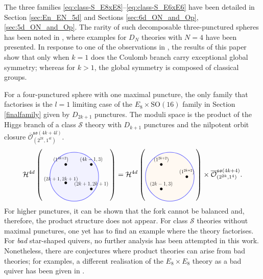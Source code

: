 \documentclass[a4paper,11pt]{article}
\begin{document}
 The three families \eqref{eq:class-S_E8xE8}--\eqref{eq:class-S_E6xE6} have been detailed in Section \ref{sec:En_EN_5d} and Sections  \ref{sec:6d_ON_and_Op}, \ref{sec:5d_ON_and_Op}. The rarity of such decomposable three-punctured spheres has been noted in \cite{Distler:2017xba}, where examples for $D_N$ theories with $N=4$ have been presented. In response to one of the observations in \cite{Distler:2017xba}, the results of this paper show that only when $k=1$ does the Coulomb branch carry exceptional global symmetry; whereas for $k>1$, the global symmetry is composed of classical groups.

For a four-punctured sphere with one maximal puncture, the only family that factorises is the $l=1$ limiting case of the $E_8 \times \mathrm{SO}(16)$ family in Section \ref{finalfamily} given by $D_{2k+1}$ punctures. The moduli space is the product of the Higgs branch of a class $\mathcal{S}$ theory with $D_{k+1}$ punctures and the nilpotent orbit closure $\overline{\mathcal{O}}^{\mathfrak{so}(4k+4l)}_{(2^{2k},1^{4l})}$. 
\begin{equation}
   \mathcal{H}^{4d} \left( \raisebox{-.5\height}{\scalebox{.6}{\begin{tikzpicture}
        \filldraw[color=blue!60, fill=blue!5, very thick](0,0) circle (2);
        \filldraw[fill=black!100] (1.4,-1) circle (.1);
        \filldraw[fill=black!100] (-.7,1) circle (.1);
        \filldraw[fill=black!100] (-.7,-0.5) circle (.1);
          \filldraw[fill=black!100] (1.4,1) circle (.1);
        \node at (1.4,-.6) {\large$(2k+1,2k+1)$};
        \node at (-1.1,1.4) {\large $(1^{4k+2})$};
        \node at (-1.1,-.2) {\large$(2k+1,2k+1)$};
            \node at (1.4,1.4) {\large $(4k-1,3)$};
    \end{tikzpicture}}} \right) =  \mathcal{H}^{4d} \left( \raisebox{-.5\height}{\scalebox{.6}{\begin{tikzpicture}
        \filldraw[color=blue!60, fill=orange!5, very thick](0,0) circle (2);
        \filldraw[fill=black!100] (1.4,0) circle (.1);
        \filldraw[fill=black!100] (-.7,1) circle (.1);
        \filldraw[fill=black!100] (-.7,-1) circle (.1);
        \node at (1.4,.4) {\large $(1^{2k+2})$};
        \node at (-.7,1.4) {\large $(1^{2k+2})$};
        \node at (-.7,-.6) {\large $(2k-1,3)$};
    \end{tikzpicture}}} \right)\times \overline{\mathcal{O}}^{\mathfrak{so}(4k+4)}_{(2^{2k},1^{4})}. 
\end{equation}
For higher punctures, it can be shown that the fork cannot be balanced and, therefore, the product structure does not appear. For class $\mathcal{S}$ theories without maximal punctures, one yet has to find an example where the theory factorises. For  \emph{bad} star-shaped quivers, no further analysis has been attempted in this work. Nonetheless, there are conjectures where product theories can arise from bad theories; for examples, a different realisation of the $E_8 \times E_8$ theory as a bad quiver has been given in \cite{Akhond:2021knl}. 
\end{document}
